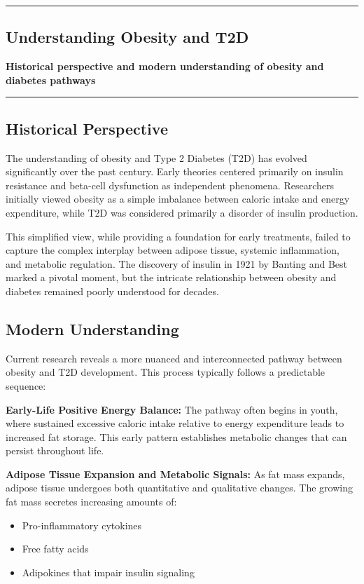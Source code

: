 {\color{gray}\hrule}
\begin{center}
\section{Understanding Obesity and T2D}
\textbf{Historical perspective and modern understanding of obesity and diabetes pathways}
\bigskip
\end{center}
{\color{gray}\hrule}
\begin{multicols}{2}
\subsection{Historical Perspective}
The understanding of obesity and Type 2 Diabetes (T2D) has evolved significantly over the past century. Early theories centered primarily on insulin resistance and beta-cell dysfunction as independent phenomena. Researchers initially viewed obesity as a simple imbalance between caloric intake and energy expenditure, while T2D was considered primarily a disorder of insulin production.

This simplified view, while providing a foundation for early treatments, failed to capture the complex interplay between adipose tissue, systemic inflammation, and metabolic regulation. The discovery of insulin in 1921 by Banting and Best marked a pivotal moment, but the intricate relationship between obesity and diabetes remained poorly understood for decades.

\subsection{Modern Understanding}
Current research reveals a more nuanced and interconnected pathway between obesity and T2D development. This process typically follows a predictable sequence:

\textbf{Early-Life Positive Energy Balance:} The pathway often begins in youth, where sustained excessive caloric intake relative to energy expenditure leads to increased fat storage. This early pattern establishes metabolic changes that can persist throughout life.

\textbf{Adipose Tissue Expansion and Metabolic Signals:} As fat mass expands, adipose tissue undergoes both quantitative and qualitative changes. The growing fat mass secretes increasing amounts of:
\begin{itemize}
    \item Pro-inflammatory cytokines
    \item Free fatty acids
    \item Adipokines that impair insulin signaling
\end{itemize}


\end{multicols}

